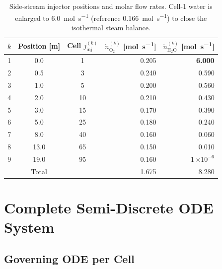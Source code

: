 \begin{table}[H]
\centering
\footnotesize
\caption{Side-stream injector positions and molar flow rates. Cell-1 water is enlarged to \SI{6.0}{\mole\per\second} (reference \SI{0.166}{\mole\per\second}) to close the isothermal steam balance.}\label{tab:injectors}
\begin{tabular*}{\textwidth}{@{\extracolsep{\fill}}cccrr}
\toprule
\(k\) & Position [m] & Cell \(j_{\mathrm{inj}}^{(k)}\) &
  \(\dot{n}_{\mathrm{O_2}}^{(k)}\) [\si{\mole\per\second}] &
  \(\dot{n}_{\mathrm{H_2O}}^{(k)}\) [\si{\mole\per\second}] \\
\midrule
1 & 0.0  & 1  & 0.205 & \textbf{6.000} \\
2 & 0.5  & 3  & 0.240 & 0.590 \\
3 & 1.0  & 5  & 0.200 & 0.560 \\
4 & 2.0  & 10 & 0.210 & 0.430 \\
5 & 3.0  & 15 & 0.170 & 0.390 \\
6 & 5.0  & 25 & 0.180 & 0.240 \\
7 & 8.0  & 40 & 0.160 & 0.060 \\
8 & 13.0 & 65 & 0.150 & 0.010 \\
9 & 19.0 & 95 & 0.160 & 1\,\(\times 10^{-6}\) \\
\midrule
  & Total & & 1.675 & 8.280 \\
\bottomrule
\end{tabular*}
\end{table}
\FloatBarrier

\section{Complete Semi-Discrete ODE System}\label{sec:complete_system}

\subsection{Governing ODE per Cell}\label{ssec:per_cell_ode}

